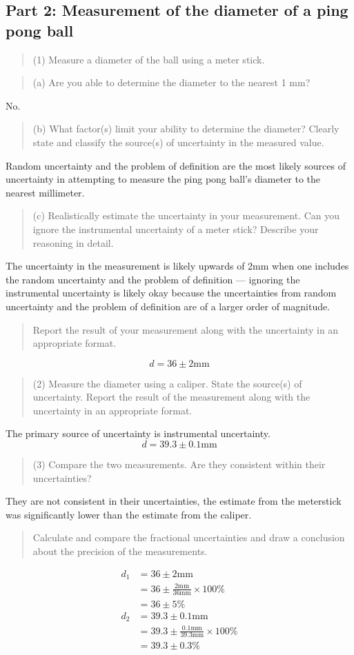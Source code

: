 \documentclass[8pt]{extarticle}
\newcommand{\plain}[1]{\textrm{#1}}
\begin{document}
\subsection*{Part 2: Measurement of the diameter of a ping pong ball}
\begin{quote}
	(1) Measure a diameter of the ball using a meter stick. 
\end{quote}
\begin{quote}
	(a) Are you able to determine the diameter to the nearest 1 mm?
\end{quote}
No.
\begin{quote}
	(b) What factor(s) limit your ability to determine the diameter? Clearly state and classify the source(s) of uncertainty in the measured value.
\end{quote}
Random uncertainty and the problem of definition are the most likely sources of uncertainty in attempting to measure the ping pong ball's diameter to the nearest millimeter.
\begin{quote}
	(c) Realistically estimate the uncertainty in your measurement. Can you ignore the instrumental uncertainty of a meter stick? Describe your reasoning in detail.
\end{quote}
The uncertainty in the measurement is likely upwards of 2mm when one includes the random uncertainty and the problem of definition — ignoring the instrumental uncertainty is likely okay because the uncertainties from random uncertainty and the problem of definition are of a larger order of magnitude.
\begin{quote}
	Report the result of your measurement along with the uncertainty in an appropriate format.
\end{quote}
\[ d = 36 \pm 2\plain{mm} \]
\begin{quote}
	(2) Measure the diameter using a caliper. State the source(s) of uncertainty. Report the result of the measurement along with the uncertainty in an appropriate format.
\end{quote}
The primary source of uncertainty is instrumental uncertainty.
\[ d = 39.3 \pm 0.1\plain{mm} \]
\begin{quote}
	(3) Compare the two measurements. Are they consistent within their uncertainties? 
\end{quote}
They are not consistent in their uncertainties, the estimate from the meterstick was significantly lower than the estimate from the caliper.
\begin{quote}
	Calculate and compare the fractional uncertainties and draw a conclusion about the precision of the measurements. 
\end{quote}
\begin{align*}
	d_1 &= 36 \pm 2\plain{mm}\\
	&= 36 \pm \frac{2\plain{mm}}{36\plain{mm}}\times 100\%\\
	&= 36\pm 5\%\\
	d_2 &= 39.3\pm 0.1\plain{mm}\\
	&= 39.3\pm \frac{0.1\plain{mm}}{39.3\plain{mm}}\times 100\%\\
	&= 39.3\pm 0.3\%
\end{align*}
\end{document}
